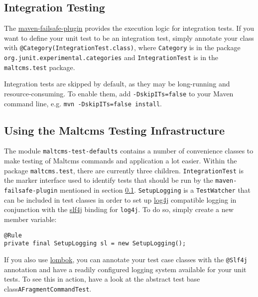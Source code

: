 \subsection{Integration Testing}\label{sec:integration-testing}
The \href{http://maven.apache.org/plugins/maven-failsafe-plugin}{maven-failsafe-plugin} provides the execution logic for integration tests. If you want to define your unit test to be an integration test, simply 
annotate your class with \verb|@Category(IntegrationTest.class)|, where \verb|Category| is in the package \verb|org.junit.experimental.categories| and \verb|IntegrationTest| is in the \verb|maltcms.test| package.

Integration tests are skipped by default, as they may be long-running and resource-consuming. To enable them, add \verb|-DskipITs=false| to your Maven command line, e.g.
\verb|mvn -DskipITs=false install|. 

\subsection{Using the Maltcms Testing Infrastructure}\label{sec:using-the-maltcms-testing-infrastructure}
The module \verb|maltcms-test-defaults| contains a number of convenience classes to make testing of Maltcms commands and application a lot easier.
Within the package \verb|maltcms.test|, there are currently three children. \verb|IntegrationTest| is the marker interface used to identify tests that should be run 
by the \verb|maven-failsafe-plugin| mentioned in section \ref{sec:integration-testing}. \verb|SetupLogging| is a \verb|TestWatcher| that can be included in test classes in order to set up \href{http://logging.apache.org/log4j/1.2/}{log4j} compatible logging in conjunction with the \href{http://www.slf4j.org/}{slf4j} binding for \verb|log4j|. To do so, simply create a new member variable:
\begin{lstlisting}
@Rule
private final SetupLogging sl = new SetupLogging();
\end{lstlisting}
If you also use \href{http://projectlombok.org/}{lombok}, you can annotate your test case classes with the \verb|@Slf4j| annotation and have a 
readily configured logging system available for your unit tests. To see this in action, have a look at the abstract test base class\verb|AFragmentCommandTest|.